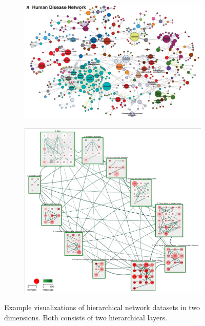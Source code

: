 \begin{figure}[h]
    \centering
    \begin{subfigure}[b]{0.4\columnwidth}
        \centering
        \includegraphics[width=\textwidth, trim={0 0 9cm 0},clip]{graphics/Human_Disease_Network.jpg}
        \label{fig:Human_Disease_Network}
    \end{subfigure}
    \begin{subfigure}[b]{0.5\columnwidth}
      \centering
      \includegraphics[width=\textwidth]{graphics/original2DdiseaseNet.jpg}
      \label{fig:original2DdiseaseNet}
    \end{subfigure}
    \caption[visualizations of hierarchical network datasets.]{Example visualizations of hierarchical network datasets in two dimensions. Both consists of two hierarchical layers.} %
    \label{fig:intro} 
  \end{figure}

